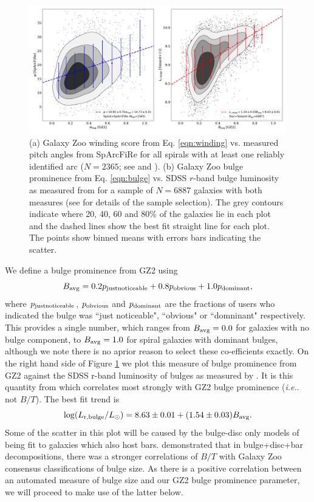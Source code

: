 \documentclass[usenatbib]{mn2e}
\newcommand{\ie}{{\it i.e.}}
\newcommand{\be}{\begin{equation}}
\newcommand{\ee}{\end{equation}}
\begin{document}
\begin{figure}
\includegraphics[width=140mm]{gz2_vs_psi_and_bulge_spread.pdf}
\caption{(a) Galaxy Zoo winding score from Eq. \ref{eqn:winding} vs. measured pitch angles from SpArcFiRe for all spirals with at least one reliably identified arc ($N=2365$; see \citealt{DavisHayes2014} and \citealt{Hart2017}). (b) Galaxy Zoo bulge prominence from Eq. \ref{eqn:bulge} vs. SDSS $r$-band bulge luminosity as measured from \citet{Simard2011} for a sample of $N=6887$ galaxies with both measures (see  \citealt{Hart2017} for details of the sample selection). The grey contours indicate where 20, 40, 60 and 80\% of the galaxies lie in each plot and the dashed lines show the best fit straight line for each plot. The points show binned means with errors bars indicating the scatter. %
\label{pitch}}
\end{figure}

We define a bulge prominence from GZ2 using
\be
\label{eqn:bulge}
B_{\rm avg} = 0.2p_{\rm  just noticeable} + 0.8p_{\rm obvious}+ 1.0p_{\rm dominant},
\ee
where $p_{\rm  just noticeable}$, $p_{\rm obvious}$ and $p_{\rm dominant}$ are the fractions of users who indicated the bulge was ``just noticeable", ``obvious" or ``domninant" respectively. This provides a single number, which ranges from $B_{\rm avg} = 0.0$ for galaxies with no bulge component, to $B_{\rm avg} = 1.0$ for spiral galaxies with dominant bulges, although we note there is no aprior reason to select these co-efficients exactly. On the right hand side of Figure \ref{pitch} we plot this measure of bulge prominence from GZ2 against the SDSS r-band luminosity of bulges as measured by \citet{Simard2011}. It is this quantity from \citet{Simard2011} which correlates most strongly with GZ2 bulge prominence (\ie. not $B/T$).  The best fit trend is 
\be 
\log(L_{\rm r,bulge}/L_\odot) = 8.63\pm0.01 + (1.54\pm0.03) B_{\rm avg}.
\ee
Some of the scatter in this plot will be caused by the bulge-disc only models of \citet{Simard2011} being fit to galaxies which also host bars. \citet{Kruk2018} demonstrated that in bulge+disc+bar decompositions, there was a stronger correlations of $B/T$ with Galaxy Zoo consensus classifications of bulge size. As there is a positive correlation between an automated measure of bulge size and our GZ2 bulge prominence parameter, we will proceed to make use of the latter below. 
 
\end{document}
